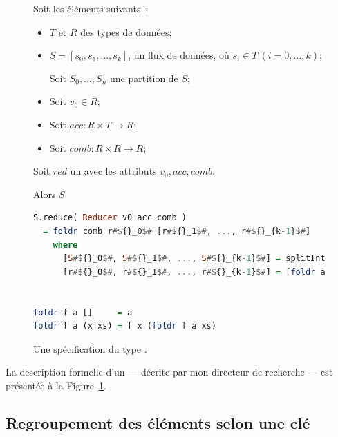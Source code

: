 \begin{figure}

\begin{framed}
Soit les \'el\'ements suivants~: 

\begin{itemize}

\item $T$ et $R$ des types de donn\'ees;

\item $S = [s_0, s_1, \ldots, s_k]$, un flux de donn\'ees, o\`u $s_i
\in T~(i=0, \ldots, k)$;

Soit $S_0, \ldots, S_n$ une partition de $S$;

\item Soit $v_0\in R$;

\item Soit $acc: R\times T \rightarrow R$;

\item Soit $comb: R\times R \rightarrow R$;


\end{itemize}

Soit $red$ un  avec les attributs $v_0, acc, comb$.

Alors $S$


\begin{lstlisting}[language=haskell,escapechar=\#]
S.reduce( Reducer v0 acc comb )
  = foldr comb r#${}_0$# [r#${}_1$#, ..., r#${}_{k-1}$#]
    where
      [S#${}_0$#, S#${}_1$#, ..., S#${}_{k-1}$#] = splitIntoSubstreams S k
      [r#${}_0$#, r#${}_1$#, ..., r#${}_{k-1}$#] = [foldr acc v0 S#${}_i$# | i <- [0, #$\ldots$#, k-1]]


foldr f a []     = a
foldr f a (x:xs) = f x (foldr f a xs)
\end{lstlisting}
\end{framed}

\caption{Une sp\'ecification du type .}
\label{reducer-spec.fig}
\end{figure}

La description formelle d'un  --- d\'ecrite par mon directeur de recherche --- est pr\'esent\'ee \`a la Figure~\ref{reducer-spec.fig}.



\subsection{Regroupement des \'el\'ements selon une cl\'e}

